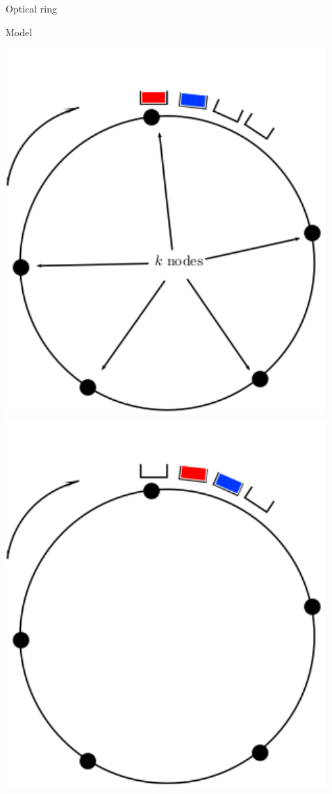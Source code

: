 \documentclass[10 pt]{beamer}
\begin{document}
\begin{frame}{Optical ring}




\begin{block}{Model}
\begin{center}
\includegraphics[scale=0.3]{anneau1.pdf}
\includegraphics[scale=0.3]{anneau2.pdf}


\end{center}
\end{block}
\end{frame}
\end{document}
